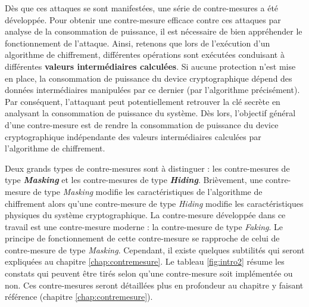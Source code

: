 \documentclass[oneside]{book}
\begin{document}
Dès que ces attaques se sont manifestées, une série de contre-mesures a été développée. Pour obtenir une contre-mesure efficace contre ces attaques par analyse de la consommation de puissance, il est nécessaire de bien appréhender le fonctionnement de l'attaque. Ainsi, retenons que lors de l’exécution d’un algorithme de chiffrement, différentes opérations sont exécutées conduisant à différentes \textbf{valeurs intermédiaires calculées}. Si aucune protection n’est mise en place, la consommation de puissance du device cryptographique dépend des données intermédiaires manipulées par ce dernier (par l’algorithme précisément). Par conséquent, l’attaquant peut potentiellement retrouver la clé secrète en analysant la consommation de puissance du système. Dès lors, l'objectif général d'une contre-mesure est de rendre la consommation de puissance du device cryptographique indépendante des valeurs intermédiaires calculées par l'algorithme de chiffrement. 

Deux grands types de contre-mesures sont à distinguer : les contre-mesures de type \textbf{\textit{Masking}} et les contre-mesures de type \textbf{\textit{Hiding}}. Brièvement, une contre-mesure de type \textit{Masking} modifie les caractéristiques de l'algorithme de chiffrement alors qu'une contre-mesure de type \textit{Hiding} modifie les caractéristiques physiques du système cryptographique. La contre-mesure développée dans ce travail est une contre-mesure moderne : la contre-mesure de type \textit{Faking}. Le principe de fonctionnement de cette contre-mesure se rapproche de celui de contre-mesure de type \textit{Masking}. Cependant, il existe quelques subtilités qui seront expliquées au chapitre \ref{chap:contremesure}. Le tableau \ref{fig:intro2} résume les constats qui peuvent être tirés selon qu'une contre-mesure soit implémentée ou non. Ces contre-mesures seront détaillées plus en profondeur au chapitre y faisant référence (chapitre \ref{chap:contremesure}).
\end{document}
